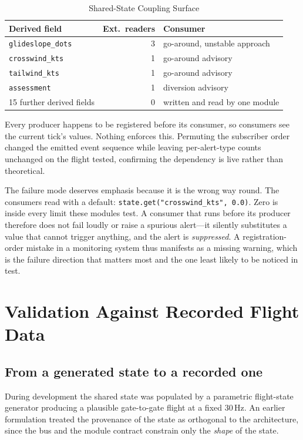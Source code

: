 \documentclass[conference]{IEEEtran}
\begin{document}
\begin{table}[t]
\caption{Shared-State Coupling Surface}
\label{tab:coupling}
\centering
\footnotesize
\begin{tabular}{@{}lrl@{}}
\toprule
\textbf{Derived field} & \textbf{Ext.\ readers} & \textbf{Consumer} \\
\midrule
\texttt{glideslope\_dots} & 3 & go-around, unstable approach \\
\texttt{crosswind\_kts}   & 1 & go-around advisory \\
\texttt{tailwind\_kts}    & 1 & go-around advisory \\
\texttt{assessment}       & 1 & diversion advisory \\
\midrule
15 further derived fields & 0 & written and read by one module \\
\bottomrule
\end{tabular}
\end{table}

Every producer happens to be registered before its consumer, so consumers see
the current tick's values. Nothing enforces this. Permuting the subscriber
order changed the emitted event sequence while leaving per-alert-type counts
unchanged on the flight tested, confirming the dependency is live rather than
theoretical.

The failure mode deserves emphasis because it is the wrong way round. The
consumers read with a default: \texttt{state.get("crosswind\_kts", 0.0)}. Zero
is inside every limit these modules test. A consumer that runs before its
producer therefore does not fail loudly or raise a spurious alert---it
silently substitutes a value that cannot trigger anything, and the alert is
\emph{suppressed}. A registration-order mistake in a monitoring system thus
manifests as a missing warning, which is the failure direction that matters
most and the one least likely to be noticed in test.

\section{Validation Against Recorded Flight Data}
\label{sec:validation}

\subsection{From a generated state to a recorded one}

During development the shared state was populated by a parametric flight-state
generator producing a plausible gate-to-gate flight at a fixed 30\,Hz. An
earlier formulation treated the provenance of the state as orthogonal to the
architecture, since the bus and the module contract constrain only the
\emph{shape} of the state.
\end{document}
